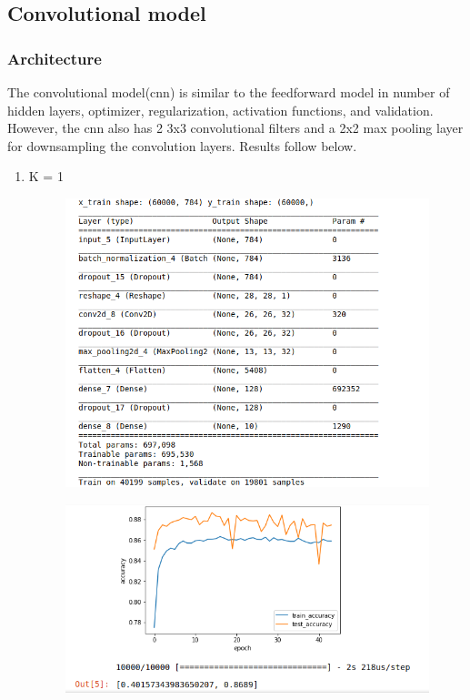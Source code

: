 \documentclass{article}
\begin{document}
\subsection{Convolutional model}
\subsubsection{Architecture}
\par The convolutional model(cnn) is similar to the feedforward model in number of hidden layers, optimizer, regularization, activation functions, and validation. However, the  cnn also has 2 3x3 convolutional  filters and a 2x2 max pooling layer for downsampling the convolution layers. Results follow below.

\begin{enumerate}
    \item  K = 1
        \begin{figure}[!ht]
            \begin{center}
                \includegraphics[width=1.0\textwidth]{ca.png}
            \end{center}
        \end{figure}
        \begin{figure}[!ht]
            \begin{center}
                \includegraphics[width=1.0\textwidth]{cb.png}

\end{center}
\end{figure}
\end{enumerate}
\end{document}
